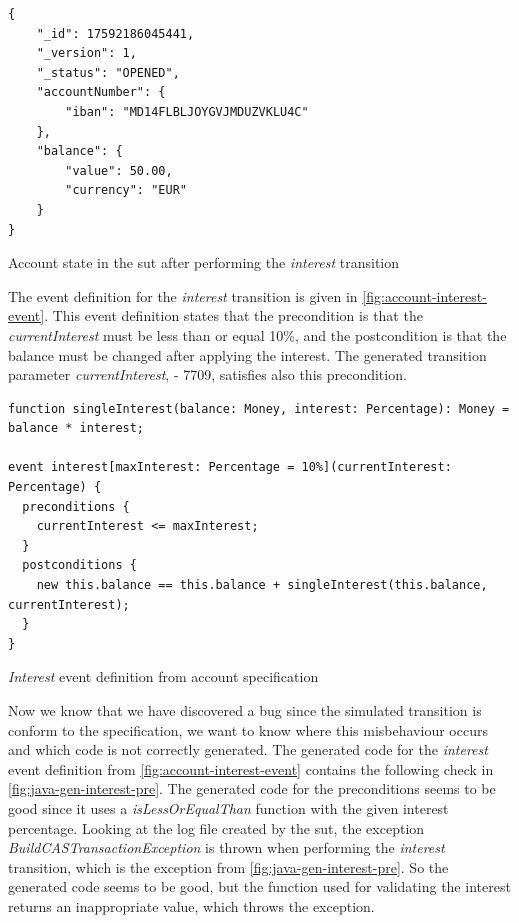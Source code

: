 \begin{sourcecode}[h!]
\begin{lstlisting}[]
{
	"_id": 17592186045441,
	"_version": 1,
	"_status": "OPENED",
	"accountNumber": {
		"iban": "MD14FLBLJOYGVJMDUZVKLU4C"
	},
	"balance": {
		"value": 50.00,
		"currency": "EUR"
	}
}
\end{lstlisting}
\caption{Account state in the \gls{sut} after performing the \textit{interest} transition}\label{fig:interest-opened-account-json}\end{sourcecode}
\FloatBarrier

The event definition for the \textit{interest} transition is given in
\autoref{fig:account-interest-event}. This event definition states that the
precondition is that the \textit{currentInterest} must be less than or equal
10\%, and the postcondition is that the balance must be changed after applying
the interest. The generated transition parameter \textit{currentInterest},
- 7709, satisfies also this precondition.

\begin{sourcecode}[h!]
\begin{lstlisting}[]
function singleInterest(balance: Money, interest: Percentage): Money =  balance * interest;

event interest[maxInterest: Percentage = 10%](currentInterest: Percentage) {
  preconditions {
    currentInterest <= maxInterest;
  }
  postconditions {
    new this.balance == this.balance + singleInterest(this.balance, currentInterest);
  }
}
\end{lstlisting}
\caption{\textit{Interest} event definition from account specification}\label{fig:account-interest-event}
\end{sourcecode}
\FloatBarrier

Now we know that we have discovered a bug since the simulated transition is
conform to the specification, we want to know where this misbehaviour occurs and
which code is not correctly generated. The generated code for the \textit{interest} event
definition from \autoref{fig:account-interest-event} contains the following
check in \autoref{fig:java-gen-interest-pre}. The generated code for the
preconditions seems to be good since it uses a \textit{isLessOrEqualThan}
function with the given interest percentage. Looking at the log file created by
the \gls{sut}, the exception \textit{BuildCASTransactionException} is thrown when
performing the \textit{interest} transition, which is the exception from
\autoref{fig:java-gen-interest-pre}. So the generated code seems to be good, but
the function used for validating the interest returns an inappropriate value,
which throws the exception.

